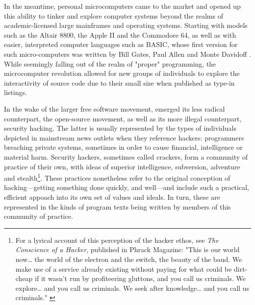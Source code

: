 In the meantime, personal microcomputers came to the market and opened up this ability to tinker and explore computer systems beyond the realms of academic-licensed large mainframes and operating systems. Starting with models such as the Altair 8800, the Apple II and the Commodore 64, as well as with easier, interpreted computer languages such as BASIC, whose first version for such micro-computers was written by Bill Gates, Paul Allen and Monte Davidoff \citep{montfort_10_2014}. While seemingly falling out of the realm of "proper" programming, the microcomputer revolution allowed for new groups of individuals to explore the interactivity of source code due to their small size when published as type-in listings.

In the wake of the larger free software movement, emerged its less radical counterpart, the open-source movement, as well as its more illegal counterpart, security hacking. The latter is usually represented by the types of individuals depicted in mainstream news outlets when they reference hackers: programmers breaching private systems, sometimes in order to cause financial, intelligence or material harm. Security hackers, sometimes called crackers, form a community of practice of their own, with ideas of superior intelligence, subversion, adventure and stealth\footnote{For a lyrical account of this perception of the hacker ethos, see \emph{The Conscience of a Hacker}, published in Phrack Magazine: "This is our world now\dots{} the world of the electron and the switch, the beauty of the baud.  We make use of a service already existing without paying for what could be dirt-cheap if it wasn't run by profiteering gluttons, and you call us criminals.  We explore\dots{} and you call us criminals.  We seek after knowledge\dots{} and you call us criminals." \citep{mentor+++_conscience_1986}}. These practices nonetheless refer to the original conception of hacking—getting something done quickly, and well—and include such a practical, efficient appoach into its own set of values and ideals. In turn, these are represented in the kinds of program texts being written by members of this community of practice.

